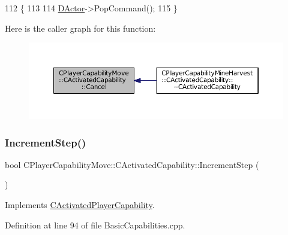 \begin{DoxyCode}
112                                                       \{
113 
114     \hyperlink{classCActivatedPlayerCapability_a54ca944b47bff2718330639941d402b0}{DActor}->PopCommand();
115 \}
\end{DoxyCode}
Here is the caller graph for this function\+:
\nopagebreak
\begin{figure}[H]
\begin{center}
\leavevmode
\includegraphics[width=350pt]{classCPlayerCapabilityMove_1_1CActivatedCapability_a6fe1e26646bd14e94ebf7abd0a41cdd3_icgraph}
\end{center}
\end{figure}
\hypertarget{classCPlayerCapabilityMove_1_1CActivatedCapability_af4670890b462f59d24195db14aeb436d}{}\label{classCPlayerCapabilityMove_1_1CActivatedCapability_af4670890b462f59d24195db14aeb436d} 
\subsubsection{\texorpdfstring{Increment\+Step()}{IncrementStep()}}
{\footnotesize\ttfamily bool C\+Player\+Capability\+Move\+::\+C\+Activated\+Capability\+::\+Increment\+Step (\begin{DoxyParamCaption}{ }\end{DoxyParamCaption})\hspace{0.3cm}{\ttfamily [virtual]}}



Implements \hyperlink{classCActivatedPlayerCapability_a943b5999a57504399293250382c0ec6a}{C\+Activated\+Player\+Capability}.



Definition at line 94 of file Basic\+Capabilities.\+cpp.


